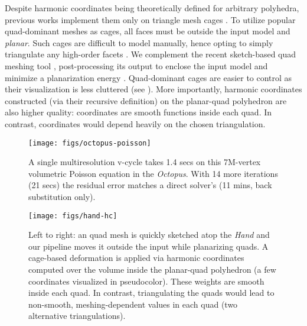 Despite harmonic coordinates being theoretically defined for arbitrary
polyhedra, previous works implement them only on triangle mesh cages
\cite{HarmonicCoodinates07}.
%
To utilize popular quad-dominant meshes as cages, all faces must be outside the
input model and \emph{planar}.
%
Such cages are difficult to model manually, hence opting to simply triangulate
any high-order facets \cite{HarmonicCoodinates07}.
%
We complement the recent sketch-based quad meshing tool \cite{Takayama:2013},
post-processing its output to enclose the input model and 
minimize a planarization energy \cite{poranne2013interactive}.
%
Quad-dominant cages are easier to control as their visualization is less
cluttered (see ).
%
More importantly, harmonic coordinates constructed (via their recursive
definition) on the planar-quad polyhedron are also higher quality:
coordinates are smooth functions inside each quad.
%
In contrast, coordinates would depend heavily on the chosen triangulation.

\begin{figure}
  \texttt{[image: figs/octopus-poisson]}
  \caption{A single multiresolution v-cycle takes 1.4 secs on this 7M-vertex
  volumetric Poisson equation in the \emph{Octopus}. With 14 more iterations
  (21 secs) the residual error matches a direct solver's (11 mins, back
  substitution only).}
  \label{fig:octopus-poisson}
\end{figure}

\begin{figure}
  \texttt{[image: figs/hand-hc]}
  \caption{Left to right: an quad mesh is quickly sketched atop the \emph{Hand}
  and our pipeline moves it outside the input while planarizing quads. A
  cage-based deformation is applied via harmonic coordinates computed over the
  volume inside the planar-quad polyhedron (a few coordinates visualized in
  pseudocolor). These weights are smooth inside each quad. In contrast,
  triangulating the quads would lead to non-smooth, meshing-dependent values in
  each quad (two alternative triangulations).}
  \label{fig:hand-hc}
\end{figure}




